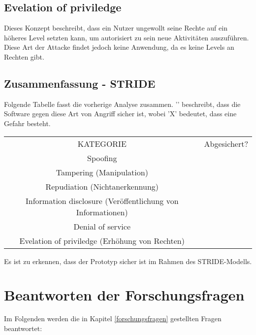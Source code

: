 \subsection{Evelation of priviledge}
Dieses Konzept beschreibt, dass ein Nutzer ungewollt seine Rechte auf ein höheres Level setzten kann, um autorisiert zu sein neue Aktivitäten auszuführen. Diese Art der Attacke findet jedoch keine Anwendung, da es keine Levels an Rechten gibt.

\subsection{Zusammenfassung - STRIDE}
Folgende Tabelle fasst die vorherige Analyse zusammen. '\checkmark' beschreibt, dass die Software gegen diese Art von Angriff sicher ist, wobei 'X' bedeutet, dass eine Gefahr besteht. 
\begin{center}
	\begin{tabular}{ c c }
		KATEGORIE & Abgesichert? \\
		Spoofing & \checkmark \\
		Tampering (Manipulation) & \checkmark \\
		Repudiation (Nichtanerkennung) & \checkmark\\
		Information disclosure (Veröffentlichung von Informationen) &\checkmark\\
		Denial of service & \checkmark\\
		Evelation of priviledge (Erhöhung von Rechten) & \checkmark \\
	\end{tabular}
\end{center}
Es ist zu erkennen, dass der Prototyp sicher ist im Rahmen des STRIDE-Modells.

\section{Beantworten der Forschungsfragen}
Im Folgenden werden die in Kapitel \ref{forschungsfragen} gestellten Fragen beantwortet:



